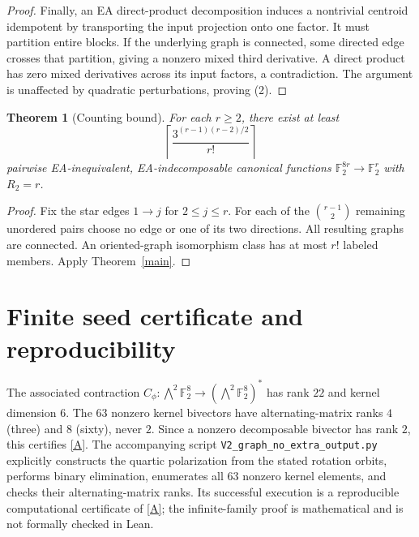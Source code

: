 \documentclass[11pt]{article}
\newtheorem{theorem}{Theorem}
\newcommand{\F}{\mathbb F}
\begin{document}
\begin{proof}
Finally, an EA direct-product decomposition induces a nontrivial centroid idempotent by transporting the input projection onto one factor. It must partition entire blocks. If the underlying graph is connected, some directed edge crosses that partition, giving a nonzero mixed third derivative. A direct product has zero mixed derivatives across its input factors, a contradiction. The argument is unaffected by quadratic perturbations, proving (2).
\end{proof}
\begin{theorem}[Counting bound]
For each $r\ge2$, there exist at least
\[
\left\lceil\frac{3^{(r-1)(r-2)/2}}{r!}\right\rceil
\]
pairwise EA-inequivalent, EA-indecomposable canonical functions $\F_2^{8r}\to\F_2^r$ with $R_2=r$.
\end{theorem}
\begin{proof}
Fix the star edges $1\to j$ for $2\le j\le r$. For each of the $\binom{r-1}{2}$ remaining unordered pairs choose no edge or one of its two directions. All resulting graphs are connected. An oriented-graph isomorphism class has at most $r!$ labeled members. Apply Theorem~\ref{main}.
\end{proof}
\section{Finite seed certificate and reproducibility}
The associated contraction $C_\phi:\bigwedge^2\F_2^8\to(\bigwedge^2\F_2^8)^*$ has rank $22$ and kernel dimension $6$. The $63$ nonzero kernel bivectors have alternating-matrix ranks $4$ (three) and $8$ (sixty), never $2$. Since a nonzero decomposable bivector has rank $2$, this certifies \eqref{A}. The accompanying script \texttt{V2\_graph\_no\_extra\_output.py} explicitly constructs the quartic polarization from the stated rotation orbits, performs binary elimination, enumerates all 63 nonzero kernel elements, and checks their alternating-matrix ranks. Its successful execution is a reproducible computational certificate of \eqref{A}; the infinite-family proof is mathematical and is not formally checked in Lean.
\end{document}
